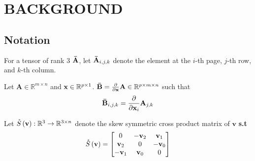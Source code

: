 \chapter{BACKGROUND} \label{chap:Background}
\section{Notation}

\begin{definition} \label{tensor_indexing}
\noindent For a tensor of rank 3 $\tensor{A}$, let $\tensor{A}_{i,j,k}$ denote the element at the $i$-th page, $j$-th row, and $k$-th column.

\begin{figure}[H]
    \centering
\end{figure}
\end{definition}

\begin{definition} \label{matrix_derivative}
Let $\mathbf{A} \in \mathbb{R}^{m \times n}$ and $\mathbf{\x} \in \mathbb{R}^{p \times 1}$. $\tensor{B} = \frac{\partial}{\partial \x}\mathbf{A} \in \mathbb{R}^{p \times m \times n }$ such that
\begin{align*}
    \tensor{B}_{i, j, k} = \frac{\partial}{\partial \x_i}\mathbf{A}_{j, k}
\end{align*}
\end{definition}

\begin{definition}
Let $\S{\mathbf{v}} : \mathbb{R}^{3} \rightarrow \mathbb{R}^{3 \times n}$  denote the skew symmetric cross product matrix of $\mathbf{v}$ \textbf{s.t}
\begin{align*}
    \S{\mathbf{v}} = \begin{bmatrix}
    0 & -\mathbf{v}_2 & \mathbf{v}_1 \\
    \mathbf{v}_2 & 0 & -\mathbf{v}_0 \\
    -\mathbf{v}_1 & \mathbf{v}_0 & 0
    \end{bmatrix}
\end{align*}
\end{definition}


